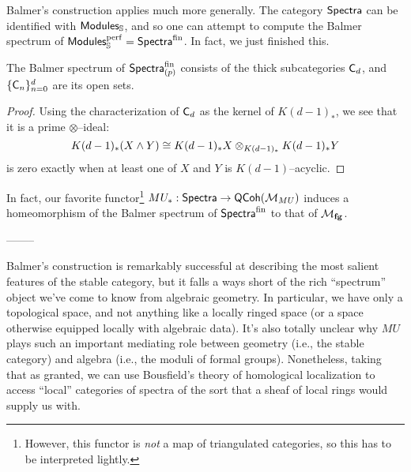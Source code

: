 Balmer's construction applies much more generally.  The category $\mathsf{Spectra}$ can be identified with $\mathsf{Modules}_{\mathbb S}$, and so one can attempt to compute the Balmer spectrum of $\mathsf{Modules}_{\mathbb S}^{\mathrm{perf}} = \mathsf{Spectra}^{\mathrm{fin}}$.  In fact, we just finished this.
\begin{theorem}
The Balmer spectrum of $\mathsf{Spectra}_{(p)}^{\mathrm{fin}}$ consists of the thick subcategories $\mathsf{C}_d$, and $\{\mathsf{C}_n\}_{n=0}^d$ are its open sets.
\end{theorem}
\begin{proof}
Using the characterization of $\mathsf{C}_d$ as the kernel of $K(d-1)_*$, we see that it is a prime $\otimes$--ideal: \[K(d-1)_*(X \wedge Y) \cong K(d-1)_* X \otimes_{K(d-1)_*} K(d-1)_* Y\] is zero exactly when at least one of $X$ and $Y$ is $K(d-1)$--acyclic.
\end{proof}

In fact, our favorite functor\footnote{However, this functor is \emph{not} a map of triangulated categories, so this has to be interpreted lightly.} $MU_*: \mathsf{Spectra} \to \mathsf{QCoh}(\mathcal{M}_{MU})$ induces a homeomorphism of the Balmer spectrum of $\mathsf{Spectra}^{\mathrm{fin}}$ to that of $\mathcal{M}_{\mathbf{fg}}$.

--------

Balmer's construction is remarkably successful at describing the most salient features of the stable category, but it falls a ways short of the rich ``spectrum'' object we've come to know from algebraic geometry.  In particular, we have only a topological space, and not anything like a locally ringed space (or a space otherwise equipped locally with algebraic data).  It's also totally unclear why $MU$ plays such an important mediating role between geometry (i.e., the stable category) and algebra (i.e., the moduli of formal groups).
Nonetheless, taking that as granted, we can use Bousfield's theory of homological localization to access ``local'' categories of spectra of the sort that a sheaf of local rings would supply us with.

